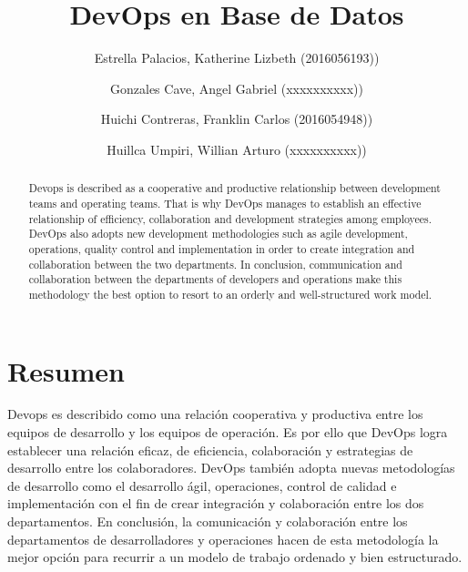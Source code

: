 \documentclass[preprint,12pt]{elsarticle}
\begin{document}
	
	\begin{frontmatter} 

		\title{\huge DevOps en Base de Datos}
		
		\author{Estrella Palacios, Katherine Lizbeth              	(2016056193))}
		\author{Gonzales Cave, Angel Gabriel              	(xxxxxxxxxx))} %
		\author{Huichi Contreras, Franklin Carlos         	(2016054948))} 
		\author{Huillca Umpiri, Willian Arturo             		(xxxxxxxxxx))} %
		\address{Escuela Profesional de Ingeniería de Sistemas}
		\address{Universidad Privada de Tacna}
		\address{Tacna, Perú}
		

		\begin{abstract}
		
Devops is described as a cooperative and productive relationship between development teams and operating teams. That is why DevOps manages to establish an effective relationship of efficiency, collaboration and development strategies among employees.
DevOps also adopts new development methodologies such as agile development, operations, quality control and implementation in order to create integration and collaboration between the two departments.
In conclusion, communication and collaboration between the departments of developers and operations make this methodology the best option to resort to an orderly and well-structured work model.

		\end{abstract}


	\end{frontmatter}


\section{Resumen}

Devops es describido como una relación cooperativa y productiva entre los equipos de desarrollo y los equipos de operación. Es por ello que DevOps logra establecer una relación eficaz, de eficiencia, colaboración y estrategias de desarrollo entre los colaboradores.
DevOps también adopta nuevas metodologías de desarrollo como el desarrollo ágil, operaciones, control de calidad e implementación con el fin de crear integración y colaboración entre los dos departamentos.
En conclusión, la comunicación y colaboración entre los departamentos de desarrolladores y operaciones hacen de esta metodología la mejor opción para recurrir a un modelo de trabajo ordenado y bien estructurado.
\end{document}
